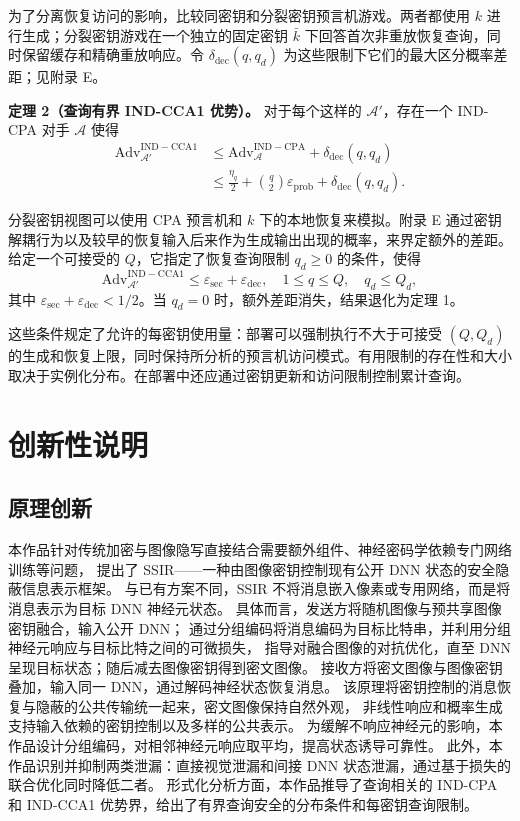 \documentclass[UTF8,a4paper,zihao=-4,fontset=windows,openany]{ctexbook}
\begin{document}
为了分离恢复访问的影响，比较同密钥和分裂密钥预言机游戏。两者都使用 \(k\) 进行生成；分裂密钥游戏在一个独立的固定密钥 \(\bar{k}\) 下回答首次非重放恢复查询，同时保留缓存和精确重放响应。令 \(\delta_{\mathrm{dec}}(q, q_d)\) 为这些限制下它们的最大区分概率差距；见附录 E。

\textbf{定理 2（查询有界 IND-CCA1 优势）。} 对于每个这样的 \(\mathcal{A}'\)，存在一个 IND-CPA 对手 \(\mathcal{A}\) 使得
\begin{equation}
\begin{aligned}
\mathrm{Adv}_{\mathcal{A}'}^{\mathrm{IND-CCA1}} &\le \mathrm{Adv}_{\mathcal{A}}^{\mathrm{IND-CPA}} + \delta_{\mathrm{dec}}(q, q_d) \\
&\le \frac{\eta_q}{2} + \binom{q}{2} \varepsilon_{\mathrm{prob}} + \delta_{\mathrm{dec}}(q, q_d).
\end{aligned} \tag{19}
\end{equation}

分裂密钥视图可以使用 CPA 预言机和 \(k\) 下的本地恢复来模拟。附录 E 通过密钥解耦行为以及较早的恢复输入后来作为生成输出出现的概率，来界定额外的差距。给定一个可接受的 \(Q\)，它指定了恢复查询限制 \(q_d \ge 0\) 的条件，使得
\begin{equation}
\mathrm{Adv}_{\mathcal{A}'}^{\mathrm{IND-CCA1}} \le \varepsilon_{\mathrm{sec}} + \varepsilon_{\mathrm{dec}}, \quad 1 \le q \le Q, \quad q_d \le Q_d, \tag{20}
\end{equation}
其中 \(\varepsilon_{\mathrm{sec}} + \varepsilon_{\mathrm{dec}} < 1/2\)。当 \(q_d = 0\) 时，额外差距消失，结果退化为定理 1。

这些条件规定了允许的每密钥使用量：部署可以强制执行不大于可接受 \((Q, Q_d)\) 的生成和恢复上限，同时保持所分析的预言机访问模式。有用限制的存在性和大小取决于实例化分布。在部署中还应通过密钥更新和访问限制控制累计查询。
\chapter{创新性说明}
\section{原理创新}
本作品针对传统加密与图像隐写直接结合需要额外组件、神经密码学依赖专门网络训练等问题，
提出了 SSIR——一种由图像密钥控制现有公开 DNN 状态的安全隐蔽信息表示框架。
与已有方案不同，SSIR 不将消息嵌入像素或专用网络，而是将消息表示为目标 DNN 神经元状态。
具体而言，发送方将随机图像与预共享图像密钥融合，输入公开 DNN；
通过分组编码将消息编码为目标比特串，并利用分组神经元响应与目标比特之间的可微损失，
指导对融合图像的对抗优化，直至 DNN 呈现目标状态；随后减去图像密钥得到密文图像。
接收方将密文图像与图像密钥叠加，输入同一 DNN，通过解码神经状态恢复消息。
该原理将密钥控制的消息恢复与隐蔽的公共传输统一起来，密文图像保持自然外观，
非线性响应和概率生成支持输入依赖的密钥控制以及多样的公共表示。
为缓解不响应神经元的影响，本作品设计分组编码，对相邻神经元响应取平均，提高状态诱导可靠性。
此外，本作品识别并抑制两类泄漏：直接视觉泄漏和间接 DNN 状态泄漏，通过基于损失的联合优化同时降低二者。
形式化分析方面，本作品推导了查询相关的 IND-CPA 和 IND-CCA1 优势界，给出了有界查询安全的分布条件和每密钥查询限制。
\end{document}
